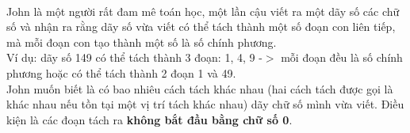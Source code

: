  

John là một người rất đam mê toán học, một lần cậu viết ra một dãy số các chữ số và nhận ra rằng dãy số vừa viết có thể tách thành một số đoạn con liên tiếp, mà mỗi đoạn con tạo thành một số là số chính phương.
\\Ví dụ: dãy số 149 có thể tách thành 3 đoạn: 1, 4, 9 -$>$ mỗi đoạn đều là số chính phương hoặc có thể tách thành 2 đoạn 1 và 49.
\\John muốn biết là có bao nhiêu cách tách khác nhau (hai cách tách được gọi là khác nhau nếu tồn tại một vị trí tách khác nhau) dãy chữ số mình vừa viết. Điều kiện là các đoạn tách ra \textbf{không bắt đầu bằng chữ số 0}.

\